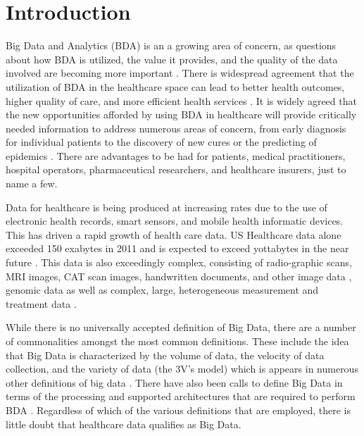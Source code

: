 \section{Introduction}

Big Data and Analytics (BDA) is an a growing area of concern, as questions about how BDA is utilized, the value it provides, and the quality of the data involved are becoming more important \parencite{molinariQualityConcernsHealth2020}. There is widespread agreement that the utilization of BDA in the healthcare space can lead to better health outcomes, higher quality of care, and more efficient health services \parencite{milenkovicBigDataAnalytics2019}. It is widely agreed that the new opportunities afforded by using BDA in healthcare will provide critically needed information to address numerous areas of concern, from early diagnosis for individual patients to the discovery of new cures or the predicting of epidemics \parencite{todorFutureTrendHealthcare2018}. There are advantages to be had for patients, medical practitioners, hospital operators, pharmaceutical researchers, and healthcare insurers, just to name a few.

Data for healthcare is being produced at increasing rates due to the use of electronic health records, smart sensors, and mobile health informatic devices. This has driven a rapid growth of health care data. US Healthcare data alone exceeded 150 exabytes in 2011 and is expected to exceed yottabytes in the near future \parencite{fangComputationalHealthInformatics2016}. This data is also exceedingly complex, consisting of radio-graphic scans, MRI images, CAT scan images, handwritten documents, and other image data \parencite{feldmanBigDataHealthcare2012}, genomic data \parencite{dolezelBigDataAnalytics2019} as well as complex, large, heterogeneous measurement and treatment data \parencite{sunBigDataAnalytics2013}.

While there is no universally accepted definition of Big Data, there are a number of commonalities amongst the most common definitions. These include the idea that Big Data is characterized by the volume of data, the velocity of data collection, and the variety of data (the 3V's model) which is appears in numerous other definitions of big data \parencite{appuswamyNobodyEverGot2013}. There have also been calls to define Big Data in terms of the processing and supported architectures that are required to perform BDA \parencite{emmanuelDefiningBigData2016}. Regardless of which of the various definitions that are employed, there is little doubt that healthcare data qualifies as Big Data.

